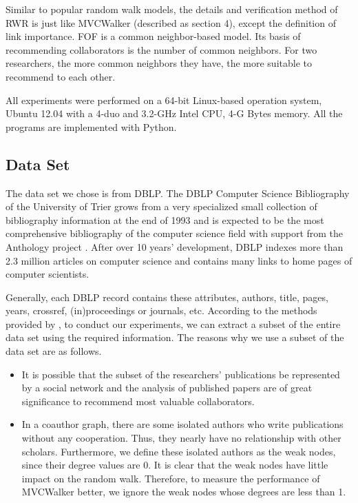 \documentclass[10pt,journal,compsoc]{IEEEtran}
\begin{document}
Similar to popular random walk models, the details and verification method of RWR is just like MVCWalker (described as section 4), except the definition of link importance. FOF is a common neighbor-based model. Its basis of recommending collaborators is the number of common neighbors. For two researchers, the more common neighbors they have, the more suitable to recommend to each other.

All experiments were performed on a 64-bit Linux-based operation system, Ubuntu 12.04 with a 4-duo and 3.2-GHz Intel CPU, 4-G Bytes memory. All the programs are implemented with Python.

\subsection{Data Set}

The data set we chose is from DBLP. The DBLP Computer Science Bibliography of the University of Trier grows from a very specialized small collection of bibliography information at the end of 1993 \cite{Ley:DBLP} and is expected to be the most comprehensive bibliography of the computer science field with support from the Anthology project \cite{Ley:DBLPEvolution}. After over 10 years' development, DBLP indexes more than 2.3 million articles on computer science and contains many links to home pages of computer scientists.

Generally, each DBLP record contains these attributes, authors, title, pages, years, crossref, (in)proceedings or journals, etc. According to the methods provided by \cite{Ley:DBLP}, to conduct our experiments, we can extract a subset of the entire data set using the required information. The reasons why we use a subset of the data set are as follows.

\begin{itemize}
\item It is possible that the subset of the researchers' publications be represented by a social network \cite{Brandao:using} and the analysis of published papers are of great significance to recommend most valuable collaborators.
\item In a coauthor graph, there are some isolated authors who write publications without any cooperation. Thus, they nearly have no relationship with other scholars. Furthermore, we define these isolated authors as the weak nodes, since their degree values are 0. It is clear that the weak nodes have little impact on the random walk. Therefore, to measure the performance of MVCWalker better, we ignore the weak nodes whose degrees are less than 1.
\end{itemize}
\end{document}

